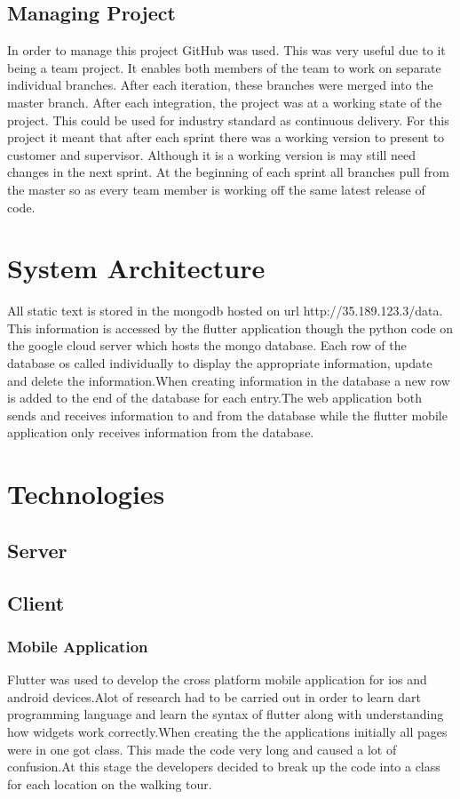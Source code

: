 \subsection{Managing Project}
In order to manage this project GitHub was used. This was very useful due to it being a team project. It enables both members of the team to work on separate individual branches. After each iteration, these branches were merged into the master branch. After each integration, the project was at a working state of the project. This could be used for industry standard as continuous delivery. For this project it meant that after each sprint there was a working version to present to customer and supervisor. Although it is a working version is may still need changes in the next sprint. At the beginning of each sprint all branches pull from the master so as every team member is working off the same latest release of code.
\section{System Architecture}
All static text is stored in the mongodb hosted on url http://35.189.123.3/data. This information is accessed by the flutter application though the python code on the google cloud server which hosts the mongo database. Each row of the database os called individually to display the appropriate information, update and delete the information.When creating information in the database a new row is added to the end of the database for each entry.The web application both sends and receives information to and from the database while the flutter mobile application only receives information from the database.
\section{Technologies}
\subsection{Server}
\subsection{Client}

\subsubsection{Mobile Application}
Flutter was used to develop the cross platform mobile application for ios and android devices.Alot of research had to be carried out in order to learn dart programming language and learn the syntax of flutter along with understanding how widgets work correctly.When creating the the applications initially all pages were in one got class. This made the code very long and caused a lot of confusion.At this stage the developers decided to break up the code into a class for each location on the walking tour.

